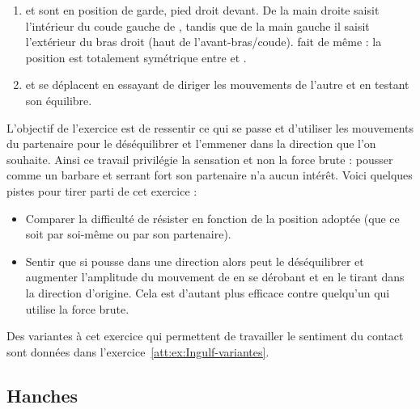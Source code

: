 \begin{exercice}
\label{struc:ex:Ingulf}


\begin{enumerate}
	\item \A et \D sont en position de garde, pied droit devant.
	De la main droite \A saisit l'intérieur du coude gauche de \D, tandis que de la main gauche il saisit l'extérieur du bras droit (haut de l'avant-bras/coude).
	\D fait de même : la position est totalement symétrique entre \A et \D.
	
	\item \A et \D se déplacent en essayant de diriger les mouvements de l'autre et en testant son équilibre.
\end{enumerate}

L'objectif de l'exercice est de ressentir ce qui se passe et d'utiliser les mouvements du partenaire pour le déséquilibrer et l'emmener dans la direction que l'on souhaite.
Ainsi ce travail privilégie la sensation et non la force brute : pousser comme un barbare et serrant fort son partenaire n'a aucun intérêt.
Voici quelques pistes pour tirer parti de cet exercice :
\begin{itemize}
	\item Comparer la difficulté de résister en fonction de la position adoptée (que ce soit par soi-même ou par son partenaire).
	
	\item Sentir que si \A pousse dans une direction alors \D peut le déséquilibrer et augmenter l'amplitude du mouvement de \A en se dérobant et en le tirant dans la direction d'origine.
	Cela est d'autant plus efficace contre quelqu'un qui utilise la force brute.
\end{itemize}

Des variantes à cet exercice qui permettent de travailler le sentiment du contact sont données dans l'exercice~\ref{att:ex:Ingulf-variantes}.


\end{exercice}



\subsection{Hanches}


